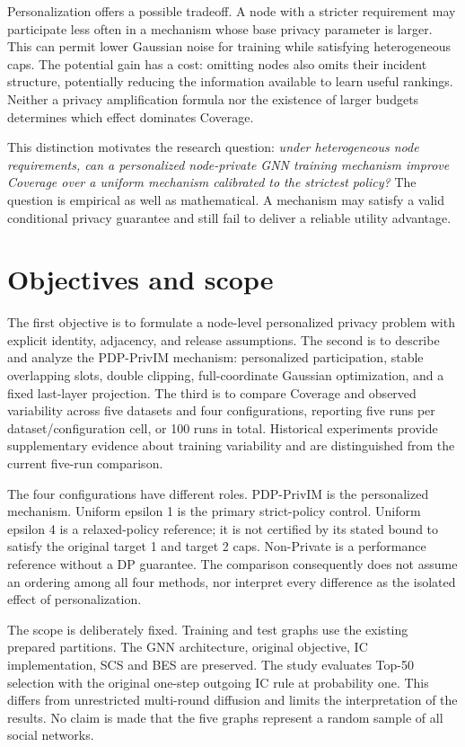 Personalization offers a possible tradeoff. A node with a stricter requirement may participate less often in a mechanism whose base privacy parameter is larger. This can permit lower Gaussian noise for training while satisfying heterogeneous caps. The potential gain has a cost: omitting nodes also omits their incident structure, potentially reducing the information available to learn useful rankings. Neither a privacy amplification formula nor the existence of larger budgets determines which effect dominates Coverage.

This distinction motivates the research question: \emph{under heterogeneous node requirements, can a personalized node-private GNN training mechanism improve Coverage over a uniform mechanism calibrated to the strictest policy?} The question is empirical as well as mathematical. A mechanism may satisfy a valid conditional privacy guarantee and still fail to deliver a reliable utility advantage.

\section{Objectives and scope}
The first objective is to formulate a node-level personalized privacy problem with explicit identity, adjacency, and release assumptions. The second is to describe and analyze the PDP-PrivIM mechanism: personalized participation, stable overlapping slots, double clipping, full-coordinate Gaussian optimization, and a fixed last-layer projection. The third is to compare Coverage and observed variability across five datasets and four configurations, reporting five runs per dataset/configuration cell, or 100 runs in total. Historical experiments provide supplementary evidence about training variability and are distinguished from the current five-run comparison.

The four configurations have different roles. PDP-PrivIM is the personalized mechanism. Uniform epsilon 1 is the primary strict-policy control. Uniform epsilon 4 is a relaxed-policy reference; it is not certified by its stated bound to satisfy the original target 1 and target 2 caps. Non-Private is a performance reference without a DP guarantee. The comparison consequently does not assume an ordering among all four methods, nor interpret every difference as the isolated effect of personalization.

The scope is deliberately fixed. Training and test graphs use the existing prepared partitions. The GNN architecture, original objective, IC implementation, SCS and BES are preserved. The study evaluates Top-50 selection with the original one-step outgoing IC rule at probability one. This differs from unrestricted multi-round diffusion and limits the interpretation of the results. No claim is made that the five graphs represent a random sample of all social networks.

